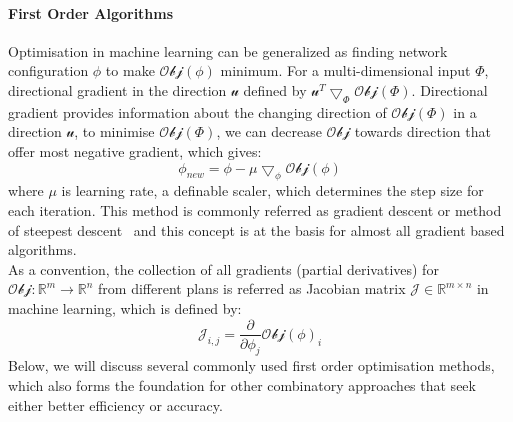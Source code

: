 \paragraph {First Order Algorithms}
Optimisation in machine learning can be generalized as finding network configuration $\phi$ to make $\mathcal{Obj}(\phi)$ minimum. For a multi-dimensional input $\Phi$, directional gradient in the direction $\mathcal{u}$ defined by $\mathcal{u}^T\bigtriangledown_{\Phi}\mathcal{Obj}(\Phi)$. Directional gradient provides information about the changing direction of $\mathcal{Obj}(\Phi)$ in a direction $\mathcal{u}$, to minimise $\mathcal{Obj}(\Phi)$, we can decrease $\mathcal{Obj}$ towards direction that offer most negative gradient, which gives:
\begin{equation}
    \phi_{new} = \phi - \mu\bigtriangledown_{\phi}\mathcal{Obj}(\phi)
\end{equation}
where $\mu$ is learning rate, a definable scaler, which determines the step size for each iteration. This method is commonly referred as gradient descent or method of steepest descent~\cite{Debye_1909} and this concept is at the basis for almost all gradient based algorithms. \\
As a convention, the collection of all gradients (partial derivatives) for $\mathcal{Obj}:\mathbb{R}^m \to \mathbb{R}^n$ from different plans is referred as Jacobian matrix $\mathcal{J} \in \mathbb{R}^{m \times n}$ in machine learning, which is defined by:
\begin{equation}
    \mathcal{J}_{i,j} = \frac{\partial}{\partial \phi_j}\mathcal{Obj}(\phi)_i
\end{equation}
Below, we will discuss several commonly used first order optimisation methods, which also forms the foundation for other combinatory approaches that seek either better efficiency or accuracy. 
